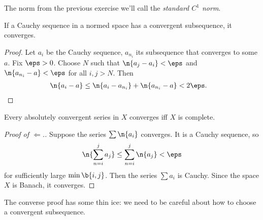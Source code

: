 \begin{definition}
  The norm from the previous exercise we'll call the \emph{standard $C^1$ norm}.
\end{definition}

\begin{proposition}
  If a Cauchy sequence in a normed space has a convergent subsequence, it converges. 
\end{proposition}

\begin{proof}
  Let $a_i$ be the Cauchy sequence, $a_{n_i}$ its subsequence that converges to some $a$. Fix $\eps > 0$. Choose $N$ such that $\n{a_j-a_i} < \eps$ and $\n{a_{n_i}-a} < \eps$ for all $i,j > N$. Then
  \begin{align*}
    \n{a_i - a}
    &\le \n{a_i - a_{n_i}} + \n{a_{n_i}-a}
    < 2\eps.
  \end{align*}
\end{proof}

\begin{proposition}
  Every absolutely convergent series in $X$ converges iff $X$ is complete.
\end{proposition}

\begin{proof}[Proof of $\Leftarrow$.]
  Suppose the series $\sum \n{a_i}$ converges.
  It is a Cauchy sequence, so
  \begin{align*}
    \n{\sum_{n=i}^j a_j}
    \le \sum_{n=i}^j \n{a_j}
    < \eps
  \end{align*}
  for sufficiently large $\min \b{i, j}$.
  Then the series $\sum a_i$ is Cauchy.
  Since the space $X$ is Banach, it converges.
\end{proof}

The converse proof has some thin ice: we need to be careful about how to choose a convergent subsequence.

